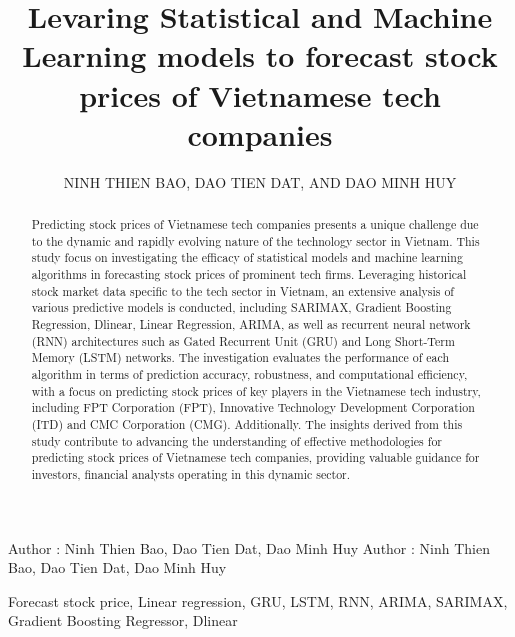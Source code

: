 \documentclass{ieeeojies}
\begin{document}
\raggedbottom 
\title{Levaring Statistical and Machine Learning models to forecast stock prices of Vietnamese tech companies}

\author{\uppercase{Ninh Thien Bao},
    \uppercase{Dao Tien Dat, and Dao Minh Huy}}

\address[1]{Faculty of Information Systems, University of Information Technology, (e-mail: 21520621@gm.uit.edu.vn)}
\address[2]{Faculty of Information Systems, University of Information Technology, (e-mail: 21521930@gm.uit.edu.vn)}
\address[3]{Faculty of Information Systems, University of Information Technology, (e-mail: 21520912@gm.uit.edu.vn)}

\markboth
{Author \headeretal: Ninh Thien Bao, Dao Tien Dat, Dao Minh Huy}
{Author \headeretal: Ninh Thien Bao, Dao Tien Dat, Dao Minh Huy}

\begin{abstract}
    Predicting stock prices of Vietnamese tech companies presents a unique challenge due to the dynamic and rapidly evolving nature of the technology sector in Vietnam. This study focus on investigating the efficacy of statistical models and machine learning algorithms in forecasting stock prices of prominent tech firms. Leveraging historical stock market data specific to the tech sector in Vietnam, an extensive analysis of various predictive models is conducted, including SARIMAX, Gradient Boosting Regression, Dlinear, Linear Regression, ARIMA, as well as recurrent neural network (RNN) architectures such as Gated Recurrent Unit (GRU) and Long Short-Term Memory (LSTM) networks. The investigation evaluates the performance of each algorithm in terms of prediction accuracy, robustness, and computational efficiency, with a focus on predicting stock prices of key players in the Vietnamese tech industry, including FPT Corporation (FPT), Innovative Technology Development Corporation (ITD) and CMC Corporation (CMG). Additionally. The insights derived from this study contribute to advancing the understanding of effective methodologies for predicting stock prices of Vietnamese tech companies, providing valuable guidance for investors, financial analysts operating in this dynamic sector.
\end{abstract}

\begin{keywords}
    Forecast stock price, Linear regression, GRU, LSTM, RNN, ARIMA, SARIMAX, Gradient Boosting Regressor, Dlinear 
\end{keywords}
\end{document}
